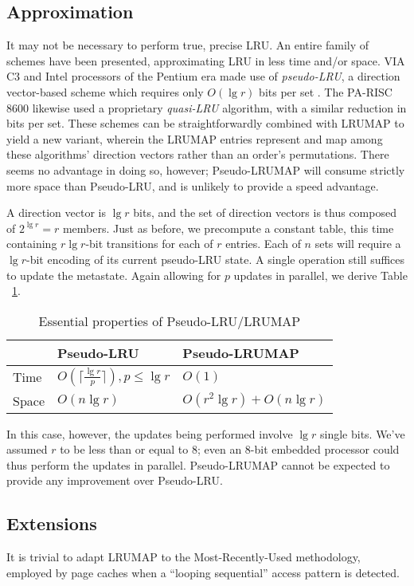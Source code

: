 \documentclass[10pt]{sigplanconf}
\begin{document}
\subsection{Approximation}
It may not be necessary to perform true, precise LRU. An entire family of
schemes have been presented, approximating LRU in less time and/or space.
VIA C3\textsuperscript{\textregistered} and Intel processors of the Pentium\textsuperscript{\textregistered} era \citep{shanley} made use of
\textit{pseudo-LRU}, a direction vector-based scheme which requires only
$O(\lg{r})$ bits per set \citep{handy}. The PA-RISC 8600 \citep{hurd} likewise used
a proprietary \textit{quasi-LRU} algorithm, with a similar reduction in bits
per set. These schemes can be straightforwardly combined with LRUMAP to yield a
new variant, wherein the LRUMAP entries represent and map among these
algorithms' direction vectors rather than an order's permutations. There seems
no advantage in doing so, however; Pseudo-LRUMAP will consume strictly more space
than Pseudo-LRU, and is unlikely to provide a speed advantage.

A direction vector is $\lg{r}$ bits, and the set of direction vectors is thus
composed of $2^{\lg{r}}=r$ members. Just as before, we precompute a constant
table, this time containing $r \lg{r}$-bit transitions for each of $r$
entries. Each of $n$ sets will require a $\lg{r}$-bit encoding of its current
pseudo-LRU state. A single operation still suffices to update the metastate.
Again allowing for $p$ updates in parallel, we derive Table ~\ref{tab:plru}.

\begin{table}[h]
\begin{center}
	\begin{tabular}{|l|l|l|}
	\hline
	& Pseudo-LRU & Pseudo-LRUMAP \\
	\hline
	Time & $O(\lceil\frac{\lg{r}}{p}\rceil), {p}\le{\lg{r}}$ & $O(1)$ \\
	\hline
	Space & $O(n\lg{r})$ & $O(r^{2}\lg{r}) + O(n\lg{r})$ \\
	\hline
	\end{tabular}
	\caption{Essential properties of Pseudo-LRU/LRUMAP}
\label{tab:plru}
\end{center}
\end{table}

In this case, however, the updates being performed involve $\lg{r}$ single bits.
We've assumed $r$ to be less than or equal to 8; even an 8-bit embedded processor
could thus perform the updates in parallel. Pseudo-LRUMAP cannot be expected to
provide any improvement over Pseudo-LRU.
\subsection{Extensions}
It is trivial to adapt LRUMAP to the Most-Recently-Used methodology, employed
by page caches when a ``looping sequential'' \citep{dewitt} access pattern is
detected.


\end{document}
